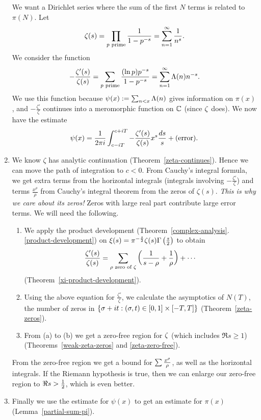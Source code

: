 \begin{enumerate}
We want a Dirichlet series where the sum of the first $N$ terms is related to $\pi(N)$.
Let
\[
\zeta(s)=\prod_{p\text{ prime}} \frac{1}{1-p^{-s}}=\sum_{n=1}^{\infty}\frac{1}{n^s}.
\]
We consider the function
\[
-\frac{\zeta'(s)}{\zeta(s)}=\sum_{p\text{ prime}} \frac{(\ln p)p^{-s}}{1-p^{-s}}
=\sum_{n=1}^{\infty} \Lambda(n)n^{-s}.
\]
We use this function because $\psi(x):=\sum_{n<x} \Lambda(n)$ gives information on $\pi(x)$, and 
$-\frac{\zeta'}{\zeta}$ continues into a meromorphic function on $\mathbb{C}$ (since $\zeta$ does). We now have the estimate
\[
\psi(x)=\frac{1}{2\pi i}\int_{c-iT}^{c+iT} -\frac{\zeta'(s)}{\zeta(s)} x^s\frac{ds}{s}+(\text{error}).
\]
\item We know $\zeta$ has analytic continuation (Theorem~\ref{zeta-continues}). Hence we can move the path of integration to $c<0$. From Cauchy's integral formula, we get extra terms from the horizontal integrals (integrals involving $-\frac{\zeta'}{\zeta}$) and terms $\frac{x^{\rho}}{\rho}$ from Cauchy's integral theorem from the zeros of $\zeta(s)$. {\it This is why we care about its zeros!} Zeros with large real part contribute large error terms.
We will need the following.
\begin{enumerate}
\item
We apply the product development (Theorem~\ref{complex-analysis}.\ref{product-development}) on $\xi(s)=\pi^{-\frac s2}\zeta(s)\Gamma\left( {\frac{s}{2}} \right)$ to obtain
\[
\frac{\zeta'(s)}{\zeta(s)}=\sum_{\rho\text{ zero of }\zeta}\left( {\frac{1}{s-\rho}+\frac{1}{\rho}} \right)+\cdots
\]
(Theorem~\ref{xi-product-development}).
\item
Using the above equation for $\frac{\zeta'}{\zeta}$, we calculate the asymptotics of $N(T)$, the number of zeros in $\left\{{\sigma+it}:{(\sigma,t)\in[0,1]\times[-T,T]}\right\}$ (Theorem~\ref{zeta-zeros}).
\item
From (a) to (b) we get a zero-free region for $\zeta$ (which includes $\Re s\ge 1$) (Theorems~\ref{weak-zeta-zeros} and \ref{zeta-zero-free}).
\end{enumerate}
From the zero-free region we get a bound for $\sum\frac{x^{\rho}}{\rho}$, as well as the horizontal integrals. 
If the Riemann hypothesis is true, then we can enlarge our zero-free region to $\Re s> \frac{1}{2}$, which is even better. 
\item Finally we use the estimate for $\psi(x)$ to get an estimate for $\pi(x)$ (Lemma~\ref{partial-sum-pi}).
\end{enumerate}
